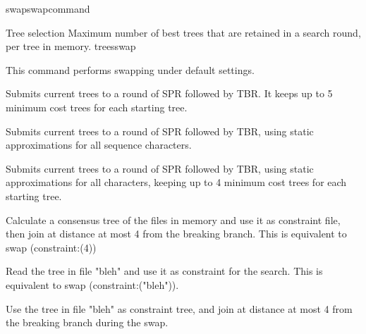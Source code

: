 \begin{command}{swap}{swapcommand}
\begin{arguments}
\begin{argumentgroup}{Tree selection}
            {Maximum number of best trees that are retained in a search round,
            per tree in memory.}
            {treesswap}

    \end{argumentgroup}
    
	\end{arguments}


	\begin{poyexamples} 
            {This command performs swapping under default settings.}

            {Submits current trees to a round of SPR followed by TBR. It keeps
            up to 5 minimum cost trees for each starting tree.}

            {Submits current trees to a round of SPR followed by TBR, using
            static approximations for all sequence characters.}
            
            {Submits current trees to a round of SPR followed by TBR, using
            static approximations for all characters, keeping up to 4 minimum
            cost trees for each starting tree.}
            
            {Calculate a consensus tree of the files in memory and use it as
            constraint file, then join at distance at most 4 from the breaking
            branch. This is equivalent to swap (constraint:(4))}
	
            {Read the tree in file "bleh" and use it as constraint for the
            search. This is equivalent to swap (constraint:("bleh")).}	
		
            {Use the tree in file "bleh" as constraint tree, and join at
            distance at most 4 from the breaking branch during the swap.}
            
	\end{poyexamples}

	\begin{poyalso}
	\end{poyalso} 

\end{command}

